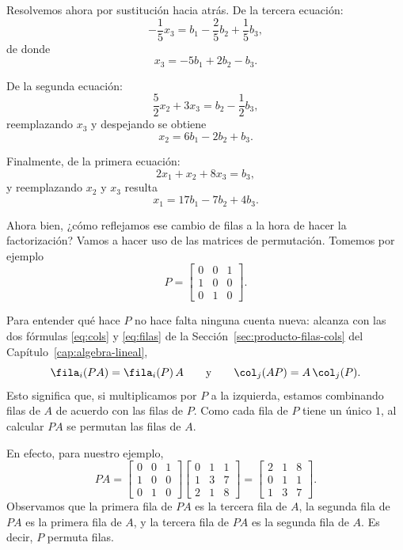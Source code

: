 Resolvemos ahora por sustitución hacia atrás. De la tercera ecuación:
\[
-\frac{1}{5}x_3 = b_1 - \frac{2}{5}b_2 + \frac{1}{5}b_3,
\]
de donde
\[
x_3 = -5b_1 + 2b_2 - b_3.
\]

De la segunda ecuación:
\[
\frac{5}{2}x_2 + 3x_3 = b_2 - \frac{1}{2}b_3,
\]
reemplazando $x_3$ y despejando se obtiene
\[
x_2 = 6b_1 - 2b_2 + b_3.
\]

Finalmente, de la primera ecuación:
\[
2x_1 + x_2 + 8x_3 = b_3,
\]
y reemplazando $x_2$ y $x_3$ resulta
\[
x_1 = 17b_1 - 7b_2 + 4b_3.
\]

Ahora bien, ¿cómo reflejamos ese cambio de filas a la hora de hacer la factorización? Vamos a hacer uso de las matrices de permutación. Tomemos por ejemplo
\[
P = \begin{bmatrix}
0 & 0 & 1 \\
1 & 0 & 0 \\
0 & 1 & 0
\end{bmatrix}.
\]

Para entender qué hace $P$ no hace falta ninguna cuenta nueva: alcanza con las
dos fórmulas \eqref{eq:cols} y \eqref{eq:filas} de la
Sección~\ref{sec:producto-filas-cols} del Capítulo~\ref{cap:algebra-lineal},
\[
\fila_i(PA) = \fila_i(P)\,A
\qquad\text{y}\qquad
\col_j(AP) = A\,\col_j(P).
\]
Esto significa que, si multiplicamos por $P$ a la izquierda, estamos combinando filas de $A$ de acuerdo con las filas de $P$. Como cada fila de $P$ tiene un único $1$, al calcular $PA$ se permutan las filas de $A$.

En efecto, para nuestro ejemplo,
\[
PA =
\begin{bmatrix}
0 & 0 & 1 \\
1 & 0 & 0 \\
0 & 1 & 0
\end{bmatrix}
\begin{bmatrix}
0 & 1 & 1 \\
1 & 3 & 7 \\
2 & 1 & 8
\end{bmatrix}
=
\begin{bmatrix}
2 & 1 & 8 \\
0 & 1 & 1 \\
1 & 3 & 7
\end{bmatrix}.
\]
Observamos que la primera fila de $PA$ es la tercera fila de $A$, la segunda fila de $PA$ es la primera fila de $A$, y la tercera fila de $PA$ es la segunda fila de $A$. Es decir, $P$ permuta filas.

